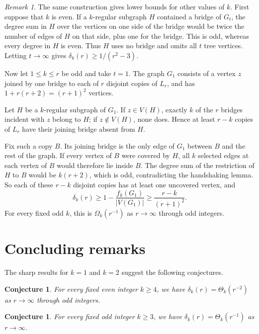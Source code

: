 \documentclass[11pt]{amsart}
\newtheorem{conjecture}[theorem]{Conjecture}
\theoremstyle{remark}
\newtheorem*{remark}{Remark}
\begin{document}
\begin{remark}
The same construction gives lower bounds for other values of $k$. First suppose that $k$ is even. If a $k$-regular subgraph $H$ contained a bridge of $G_t$, the degree sum in $H$ over the vertices on one side of the bridge would be twice the number of edges of $H$ on that side, plus one for the bridge. This is odd, whereas every degree in $H$ is even. Thus $H$ uses no bridge and omits all $t$ tree vertices. Letting $t\to\infty$ gives $\delta_k(r)\ge1/(r^2-3)$.

Now let $1\le k\le r$ be odd and take $t=1$. The graph $G_1$ consists of a vertex $z$ joined by one bridge to each of $r$ disjoint copies of $L_r$, and has $1+r(r+2)=(r+1)^2$ vertices.

Let $H$ be a $k$-regular subgraph of $G_1$. If $z\in V(H)$, exactly $k$ of the $r$ bridges incident with $z$ belong to $H$; if $z\notin V(H)$, none does. Hence at least $r-k$ copies of $L_r$ have their joining bridge absent from $H$.

Fix such a copy $B$. Its joining bridge is the only edge of $G_1$ between $B$ and the rest of the graph. If every vertex of $B$ were covered by $H$, all $k$ selected edges at each vertex of $B$ would therefore lie inside $B$. The degree sum of the restriction of $H$ to $B$ would be $k(r+2)$, which is odd, contradicting the handshaking lemma. So each of these $r-k$ disjoint copies has at least one uncovered vertex, and
\[
\delta_k(r)\ge1-\frac{f_k(G_1)}{|V(G_1)|}
\ge\frac{r-k}{(r+1)^2}.
\]
For every fixed odd $k$, this is $\Omega_k(r^{-1})$ as $r\to\infty$ through odd integers.
\end{remark}

\section{Concluding remarks}

The sharp results for $k=1$ and $k=2$ suggest the following conjectures.

\begin{conjecture}\label{conj:even}
For every fixed even integer $k\ge4$, we have $\delta_k(r)=\Theta_k(r^{-2})$ as $r\to\infty$ through odd integers.
\end{conjecture}


\begin{conjecture}\label{conj:odd}
For every fixed odd integer $k\ge3$, we have $\delta_k(r)=\Theta_k(r^{-1})$ as $r\to\infty$.
\end{conjecture}
\end{document}
